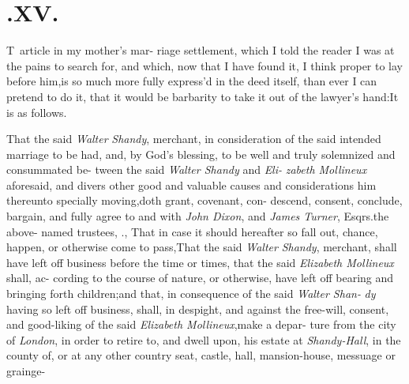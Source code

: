 \documentclass{article}
\begin{document}
\bigskip

\section{.\enspace XV.}

\lettrine{T}{\,} article in my mother’s mar-\break 
riage settlement, which I told the\break
reader I was at the pains to search for, and which, now that I have
found it, I think proper to lay before him,\tsk  is so much more fully
express’d in the deed itself, than ever I can pretend to do it, that it
would be barbarity to take it out of the lawyer’s hand:\tsk  It is as
follows.

\indent\lqq{}\break
\lqq {}\quad That the said \textit{Walter}\break
\lqq \textit{Shandy}, merchant, in consideration of\break
\lqq the said intended marriage to be had,\break
\lqq and, by God’s blessing, to be well and 
\lqq truly solemnized and consummated be-\break
\lqq tween the said \textit{Walter Shandy} and \textit{Eli-}\break
\lqq \textit{zabeth Mollineux} aforesaid, and divers\break
\lqq other good and valuable causes and\break
\lqq considerations him thereunto specially\break
\lqq moving,\tsk  doth grant, covenant, con-\break
\lqq descend, consent, conclude, bargain,\break
\lqq and fully agree to and with \textit{John Dixon},\break
\lqq and \textit{James Turner}, Esqrs.\@ the above-\break
\lqq named trustees, \etc \etc.\tsk{},\tsk\break
\lqq That in case it should hereafter so fall\break
\lqq out, chance, happen, or otherwise\break
\lqq come to pass,\tsk  That the said \textit{Walter}\break
\lqq \textit{Shandy}, merchant, shall have left off\break
\lqq business before the time or times, that\break
\lqq the said \textit{Elizabeth Mollineux} shall, ac-\break
\lqq cording to the course of nature, or\break
\lqq otherwise, have left off bearing and\break
\lqq bringing forth children;\tsk  and that,\break
\lqq in consequence of the said \textit{Walter Shan-}\break
\lqq \textit{dy} having so left off business, shall, 
\lqq in despight, and against the free-will,\break
\lqq consent, and good-liking of the said\break
\lqq \textit{Elizabeth Mollineux},\tsk  make a depar-\break
\lqq ture from the city of \textit{London}, in order\break
\lqq to retire to, and dwell upon, his estate\break
\lqq at \textit{Shandy-Hall}, in the county of\tsh,\break
\lqq or at any other country seat, castle, hall,\break
\lqq mansion-house, messuage or grainge-\break
\end{document}
